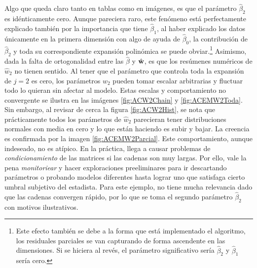 \documentclass[../Main/Main.tex]{subfiles}
\begin{document}
Algo que queda claro tanto en tablas como en imágenes, es que el parámetro $\hat{\beta}_2$ es idénticamente cero. Aunque pareciera raro, este fenómeno está perfectamente explicado también por la importancia que tiene $\hat{\beta}_1$, al haber explicado los datos únicamente en la primera dimensión con algo de ayuda de $\hat{\beta}_0$, la contribución de $\hat{\beta}_2$ y toda su correspondiente expansión polinómica se puede obviar.\footnote{Este efecto también se debe a la forma que está implementado el algoritmo, los residuales parciales se van capturando de forma ascendente en las dimensiones. Si se hiciera al revés, el parámetro significativo sería $\hat{\beta}_2$ y $\hat{\beta}_1$ sería cero.} Asimismo, dada la falta de ortogonalidad entre las $\hat{\beta}$ y $\hat{\mathbf{w}}$, es que los resúmenes numéricos de $\hat{w}_2$ no tienen sentido. Al tener que el parámetro que controla toda la expansión de $j = 2$ es cero, los parámetros $\hat{w}_2$ pueden tomar escalar arbitrarias y fluctuar todo lo quieran sin afectar al modelo. Estas escalas y comportamiento no convergente se ilustra en las imágenes \ref{fig:ACW2Chain} y \ref{fig:ACEMW2Toda}. Sin embargo, al revisar de cerca la figura \ref{fig:ACW2Hist}, se nota que prácticamente todos los parámetros de $\hat{w}_2$ parecieran tener distribuciones normales con media en cero y lo que están haciendo es subir y bajar. La creencia es confirmada por la imagen \ref{fig:ACEMW2Parcial}. Este comportamiento, aunque indeseado, no es atípico. En la práctica, llega a causar problemas de \textit{condicionamiento} de las matrices si las cadenas son muy largas. Por ello, vale la pena \textit{monitoriear} y hacer exploraciones preeliminares para ir descartando parámetros o probando modelos diferentes hasta lograr uno que satisfaga cierto umbral subjetivo del estadista. Para este ejemplo, no tiene mucha relevancia dado que las cadenas convergen rápido, por lo que se toma el segundo parámetro $\hat{\beta}_2$ con motivos ilustrativos.
\end{document}
